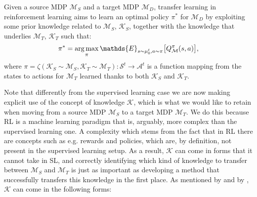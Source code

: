 \begin{definition}
	Given a source MDP $\mathcal{M}_S$ and a target MDP $\mathcal{M}_D$, transfer learning in reinforcement learning aims to learn an optimal policy $\pi^{*}$ for $\mathcal{M}_D$ by exploiting some prior knowledge related to $\mathcal{M}_S$, $\mathcal{K}_S$, together with the knowledge that underlies $\mathcal{M}_T$, $\mathcal{K}_T$ such that:
	\begin{align}
		\pi^{*} = \argmax_{\pi} \mathds{E}_{s \sim\mu_{0}^{t},a\sim\pi}\bigl[Q^{\pi}_\mathcal{M}(s,a)\bigr],
	\end{align}
	where $\pi = \zeta(\mathcal{K}_S \sim \mathcal{M}_S, \mathcal{K}_T \sim \mathcal{M}_T): \mathcal{S}^t \rightarrow \mathcal{A}^t$ is a function mapping from the states to actions for $\mathcal{M}_T$ learned thanks to both $\mathcal{K}_S$ and $\mathcal{K}_T$.
\end{definition}

Note that differently from the supervised learning case we are now making explicit use of the concept of knowledge $\mathcal{K}$, which is what we would like to retain when moving from a source MDP $\mathcal{M}_S$ to a target MDP $\mathcal{M}_T$. We do this because RL is a machine learning paradigm that is, arguably, more complex than the supervised learning one. A complexity which stems from the fact that in RL there are concepts such as e.g. rewards and policies, which are, by definition, not present in the supervised learning setup. As a result, $\mathcal{K}$ can come in forms that it cannot take in SL, and correctly identifying which kind of knowledge to transfer between $\mathcal{M}_S$ and $\mathcal{M}_T$ is just as important as developing a method that successfully transfers this knowledge in the first place. As mentioned by \citet{lazaric2012transfer} and by \citet{tirinzoni2018transfer}, $\mathcal{K}$ can come in the following forms:

